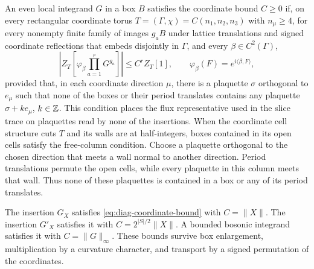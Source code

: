 An even local integrand $G$ in a box $B$ satisfies the coordinate
bound $C\ge0$ if, on every rectangular coordinate torus
$T=(\Gamma,\chi)=C(n_1,n_2,n_3)$ with $n_\mu\ge4$,
for every nonempty finite family of images $g_aB$ under lattice
translations and signed coordinate reflections that embeds
disjointly in $\Gamma$, and every $\beta\in C^2(\Gamma)$,
\begin{equation}\label{eq:diag-coordinate-bound}
 \left|Z_T\left[\varphi_\beta\prod_{a=1}^rG^{g_a}\right]\right|
       \le C^rZ_T[1],\qquad
       \varphi_\beta(F)=e^{i\langle\beta,F\rangle},
\end{equation}
provided that, in each coordinate direction $\mu$, there is a
plaquette $\sigma$ orthogonal to $e_\mu$ such that none of the
boxes or their period translates contains any plaquette
$\sigma+k e_\mu$, $k\in\mathbb Z$. This condition places the flux
representative used in the slice trace on plaquettes read by
none of the insertions.
When the coordinate cell structure cuts $T$ and its walls are at
half-integers, boxes contained in its open cells satisfy the
free-column condition. Choose a plaquette orthogonal to the chosen
direction that meets a wall normal to another direction.
Period translations permute the open cells, while every plaquette
in this column meets that wall. Thus none of these plaquettes
is contained in a box or any of its period translates.

\begin{proposition}\label{prop:diag-coordinate-insertions}
The insertion $G_X$ satisfies \eqref{eq:diag-coordinate-bound} with
$C=\|X\|$. The insertion $G'_X$ satisfies it with
$C=2^{|S|/2}\|X\|$. A bounded bosonic integrand satisfies it with
$C=\|G\|_\infty$. These bounds survive box enlargement,
multiplication by a curvature character, and transport by a
signed permutation of the coordinates.
\end{proposition}

